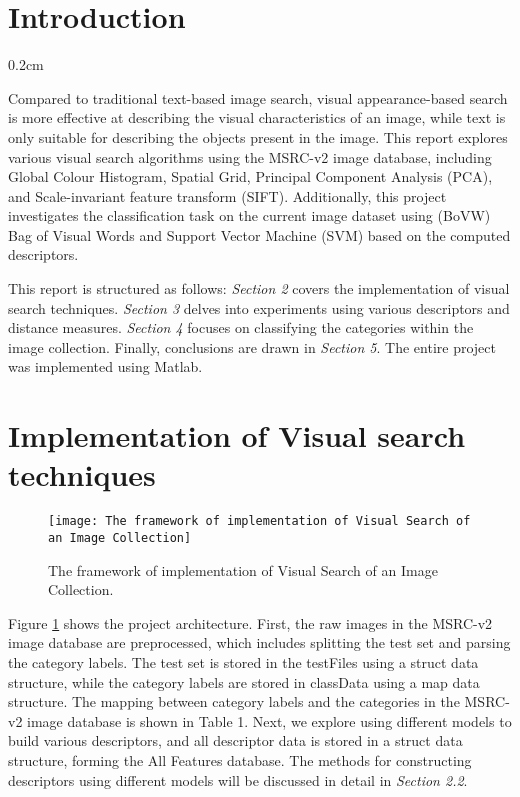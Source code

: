\documentclass{article}
\newcommand{\setParDis}{\setlength {\parskip} {0.2cm} } %
\begin{document}

\section{Introduction}
\setParDis

Compared to traditional text-based image search, visual appearance-based search is more effective at describing the visual characteristics of an image, while text is only suitable for describing the objects present in the image. This report explores various visual search algorithms using the MSRC-v2 image database, including Global Colour Histogram, Spatial Grid, Principal Component Analysis (PCA), and Scale-invariant feature transform (SIFT). Additionally, this project investigates the classification task on the current image dataset using (BoVW) Bag of Visual Words and Support Vector Machine (SVM) based on the computed descriptors.

This report is structured as follows: \textit{Section 2} covers the implementation of visual search techniques. \textit{Section 3} delves into experiments using various descriptors and distance measures. \textit{Section 4} focuses on classifying the categories within the image collection. Finally, conclusions are drawn in \textit{Section 5}. The entire project was implemented using Matlab.



\section{Implementation of Visual search techniques}

\begin{figure}[ht]
  \begin{center}
  \texttt{[image: The framework of implementation of Visual Search of an Image Collection]}
  \end{center}
  \caption{\label{fig:framework} The framework of implementation of Visual Search of an Image Collection.}
  \end{figure}

Figure \ref{fig:framework} shows the project architecture.  First, the raw images in the MSRC-v2 image database are preprocessed, which includes splitting the test set and parsing the category labels. The test set is stored in the testFiles using a struct data structure, while the category labels are stored in classData using a map data structure. The mapping between category labels and the categories in the MSRC-v2 image database is shown in Table 1. Next, we explore using different models to build various descriptors, and all descriptor data is stored in a struct data structure, forming the All Features database. The methods for constructing descriptors using different models will be discussed in detail in \textit{Section 2.2}.
\end{document}
